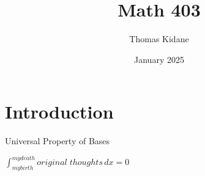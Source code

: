 \documentclass{article}
\title{Math 403}
\author{Thomas Kidane}
\date{January 2025}
\begin{document}
\maketitle

\section{Introduction}

Universal Property of Bases

$\int_{my birth}^{my death} original\;thoughts  \,dx=0 $
\end{document}
